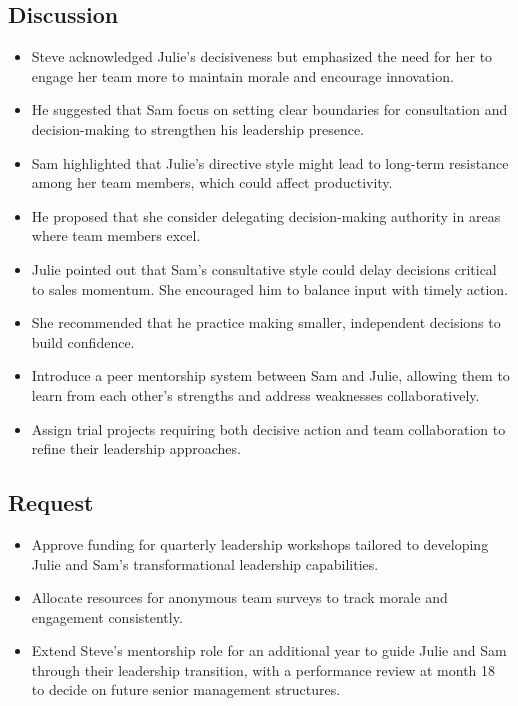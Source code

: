 \documentclass[a4paper,12pt]{article}
\begin{document}
\subsection{Discussion}

\begin{itemize}
        \item Steve acknowledged Julie’s decisiveness but emphasized the need for her to engage her team more to maintain morale and encourage innovation.
        \item He suggested that Sam focus on setting clear boundaries for consultation and decision-making to strengthen his leadership presence.
    \end{itemize}
    \begin{itemize}
        \item Sam highlighted that Julie’s directive style might lead to long-term resistance among her team members, which could affect productivity.
        \item He proposed that she consider delegating decision-making authority in areas where team members excel.
    \end{itemize}
    \begin{itemize}
        \item Julie pointed out that Sam’s consultative style could delay decisions critical to sales momentum. She encouraged him to balance input with timely action.
        \item She recommended that he practice making smaller, independent decisions to build confidence.
    \end{itemize}
    \begin{itemize}
        \item Introduce a peer mentorship system between Sam and Julie, allowing them to learn from each other’s strengths and address weaknesses collaboratively.
        \item Assign trial projects requiring both decisive action and team collaboration to refine their leadership approaches.
    \end{itemize}

\subsection{Request}

\begin{itemize}
    \item Approve funding for quarterly leadership workshops tailored to developing Julie and Sam’s transformational leadership capabilities.
    \item Allocate resources for anonymous team surveys to track morale and engagement consistently.
    \item Extend Steve’s mentorship role for an additional year to guide Julie and Sam through their leadership transition, with a performance review at month 18 to decide on future senior management structures.
\end{itemize}
\end{document}
